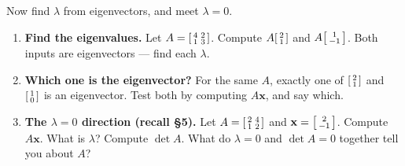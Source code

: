 \documentclass[10pt]{article}
\newcommand{\xx}{\mathbf{x}}
\begin{document}
\begin{tcolorbox}[colback=white, colframe=black!40, title=\textbf{Tier A --- Approaching Proficiency},
    fonttitle=\bfseries, arc=1.5mm, left=3mm, right=3mm, top=2mm, bottom=2mm, breakable]
Now find $\lambda$ from eigenvectors, and meet $\lambda=0$.
\begin{enumerate}[leftmargin=1.7em, itemsep=9pt]
  \item \textbf{Find the eigenvalues.} Let $A=\begin{bsmallmatrix} 4 & 2\\ 1 & 3 \end{bsmallmatrix}$.
        Compute $A\begin{bsmallmatrix} 2\\ 1 \end{bsmallmatrix}$ and $A\begin{bsmallmatrix} 1\\ -1 \end{bsmallmatrix}$.
        Both inputs are eigenvectors --- find each $\lambda$. 
  \item \textbf{Which one is the eigenvector?} For the same $A$, exactly one of
        $\begin{bsmallmatrix} 2\\ 1 \end{bsmallmatrix}$ and $\begin{bsmallmatrix} 1\\ 0 \end{bsmallmatrix}$
        is an eigenvector. Test both by computing $A\xx$, and say which. 
  \item \textbf{The $\lambda=0$ direction (recall §5).} Let $A=\begin{bsmallmatrix} 2 & 4\\ 1 & 2 \end{bsmallmatrix}$
        and $\xx=\begin{bsmallmatrix} 2\\ -1 \end{bsmallmatrix}$. Compute $A\xx$. What is $\lambda$?
        Compute $\det A$. What do $\lambda=0$ and $\det A=0$ together tell you about $A$? 
\end{enumerate}
\end{tcolorbox}
\end{document}
